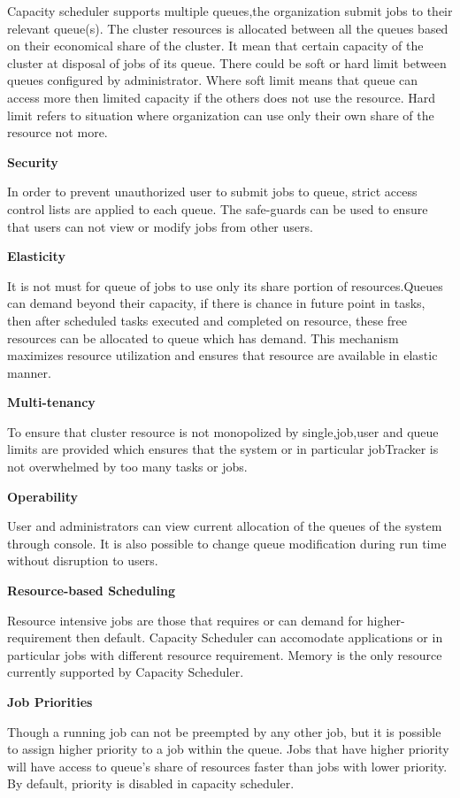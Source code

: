 Capacity scheduler supports multiple queues,the organization submit jobs to their relevant queue(s). The cluster resources is allocated between all the queues based on their economical share of the cluster. It mean that certain capacity of the cluster at disposal of jobs of its queue. There could be soft or hard limit between queues configured by administrator. Where soft limit means that queue can access more then limited capacity if the others does not use the resource. Hard limit refers to situation where organization can use only their own share of the resource not more. 


 
 \textbf{Security}
 
In order to prevent unauthorized user to submit jobs to queue, strict access control lists are applied to each queue. The safe-guards can be used to ensure that users can not view or modify jobs from other users.   
 

\textbf{Elasticity } 

It is not must for queue of jobs to use only its share portion of resources.Queues can demand beyond their capacity, if there is chance in future point in tasks, then after scheduled tasks executed and completed on resource, these free resources can be allocated to queue which has demand. This mechanism maximizes resource utilization and ensures that resource are available in elastic manner. 


\textbf{Multi-tenancy }

To ensure that cluster resource is not monopolized by single,job,user and queue limits are provided which ensures that the system or in particular jobTracker is not overwhelmed by too many tasks or jobs. 

\textbf{Operability }

User and administrators can view current allocation of the queues of the system through console. It is also possible to change queue modification during run time without disruption to users. 


\textbf{Resource-based Scheduling }

Resource intensive jobs are those that requires or can demand for higher-requirement then default. Capacity Scheduler can accomodate applications or in particular jobs with different resource requirement. Memory is the only resource currently supported by Capacity Scheduler. 

\textbf{Job Priorities }

Though a running job can not be preempted by any other job, but it is possible to assign higher priority to a job within the queue. Jobs that have higher priority will have access to queue's share of resources faster than jobs with lower priority. By default, priority is disabled in capacity scheduler.\cite{capacity} 


